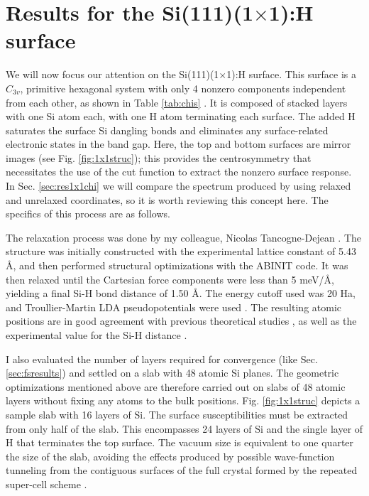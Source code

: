 
\section{Results for the \texorpdfstring{Si(111)(1$\times$1):H}{Si(111)(1x1):H}
surface}\label{sec:Si1x1results}

We will now focus our attention on the Si(111)(1$\times$1):H surface. This
surface is a $C_{3v}$, primitive hexagonal system with only 4 nonzero components
independent from each other, as shown in Table \ref{tab:chis} \cite{popovbook,
sipePRB87, mizrahiJOSA88}. It is composed of stacked layers with one Si atom
each, with one H atom terminating each surface. The added H saturates the
surface Si dangling bonds and eliminates any surface-related electronic states
in the band gap. Here, the top and bottom surfaces are mirror images (see Fig.
\ref{fig:1x1struc}); this provides the centrosymmetry that necessitates the use
of the cut function to extract the nonzero surface response. In Sec.
\ref{sec:res1x1chi} we will compare the spectrum produced by using relaxed and
unrelaxed coordinates, so it is worth reviewing this concept here. The specifics
of this process are as follows.

The relaxation process was done by my colleague, Nicolas Tancogne-Dejean
\cite{tancognedejean:tel-01235611}. The structure was initially constructed with
the experimental lattice constant of 5.43 \AA, and then performed structural
optimizations with the ABINIT \cite{gonzeCPS09, abinit} code. It was then
relaxed until the Cartesian force components were less than 5 meV/\AA, yielding
a final Si-H bond distance of 1.50 \AA. The energy cutoff used was 20 Ha, and
Troullier-Martin LDA pseudopotentials were used \cite{troullierPRB91}. The
resulting atomic positions are in good agreement with previous theoretical
studies \cite{kaxirasPRB88, jonaPRB95, alfonsoPRB96, cargnoniJOCP00,
mejiaPRB02}, as well as the experimental value for the Si-H distance
\cite{weastCRC88}.

I also evaluated the number of layers required for convergence (like Sec.
\ref{sec:fsresults}) and settled on a slab with 48 atomic Si planes. The
geometric optimizations mentioned above are therefore carried out on slabs of 48
atomic layers without fixing any atoms to the bulk positions. Fig.
\ref{fig:1x1struc} depicts a sample slab with 16 layers of Si. The surface
susceptibilities must be extracted from only half of the slab. This encompasses
24 layers of Si and the single layer of H that terminates the top surface. The
vacuum size is equivalent to one quarter the size of the slab, avoiding the
effects produced by possible wave-function tunneling from the contiguous
surfaces of the full crystal formed by the repeated super-cell scheme
\cite{mendozaPRB06}.

